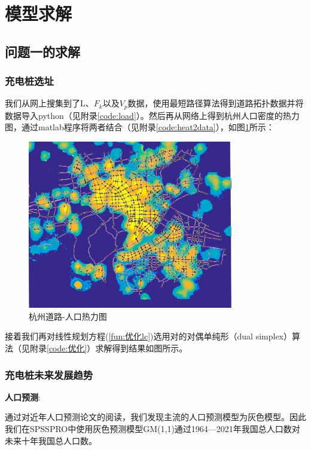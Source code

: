 \documentclass[12pt, a4paper, oneside]{ctexart}
\begin{document}
\section{模型求解}
\subsection{问题一的求解}
\subsubsection{充电桩选址}
我们从网上搜集到了L、\(F_k\)以及\(V_p\)数据，使用最短路径算法得到道路拓扑数据并将数据导入python（见附录\ref{code:load}）。然后再从网络上得到杭州人口密度的热力图，通过matlab程序将两者结合（见附录\ref{code:heat2data}），如图\ref{fig:heat}所示：

\begin{figure}[H]
    \centering
    \includegraphics[width=0.8\textwidth]{pic/杭州道路-热力图.png}
    \caption{杭州道路-人口热力图}
    \label{fig:heat}
\end{figure}


接着我们再对线性规划方程(\ref{fun:优化lc})选用对的对偶单纯形（dual simplex）算法（见附录\ref{code:优化}）求解得到结果如图所示。

\subsubsection{充电桩未来发展趋势}

\textbf{人口预测}:

通过对近年人口预测论文的阅读，我们发现主流的人口预测模型为灰色模型。因此我们在SPSSPRO中使用灰色预测模型GM(1,1)通过1964---2021年我国总人口数对未来十年我国总人口数。
\end{document}
